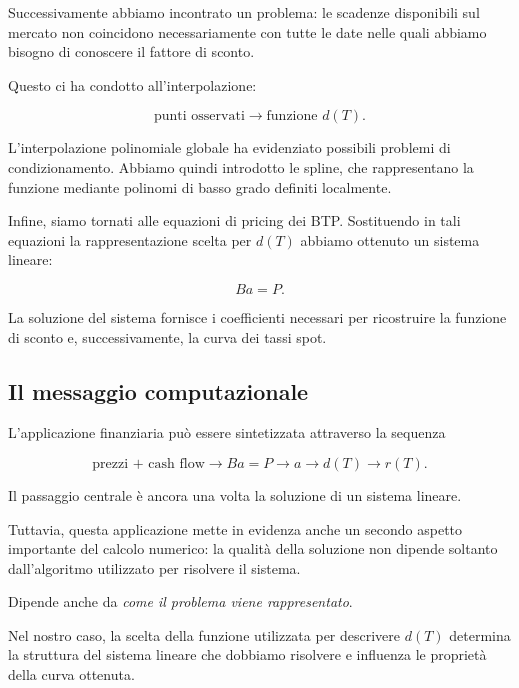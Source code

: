 Successivamente abbiamo incontrato un problema: le scadenze
disponibili sul mercato non coincidono necessariamente con tutte le
date nelle quali abbiamo bisogno di conoscere il fattore di sconto.

Questo ci ha condotto all'interpolazione:

\begin{equation*}
\text{punti osservati}
\longrightarrow
\text{funzione }d(T).
\end{equation*}

L'interpolazione polinomiale globale ha evidenziato possibili
problemi di condizionamento. Abbiamo quindi introdotto le spline,
che rappresentano la funzione mediante polinomi di basso grado
definiti localmente.

Infine, siamo tornati alle equazioni di pricing dei BTP. Sostituendo
in tali equazioni la rappresentazione scelta per $d(T)$ abbiamo
ottenuto un sistema lineare:

\begin{equation*}
    Ba=P.
\end{equation*}

La soluzione del sistema fornisce i coefficienti necessari per
ricostruire la funzione di sconto e, successivamente, la curva dei
tassi spot.


\subsection{Il messaggio computazionale}

L'applicazione finanziaria può essere sintetizzata attraverso la
sequenza

\begin{equation*}
\text{prezzi + cash flow}
\longrightarrow
Ba=P
\longrightarrow
a
\longrightarrow
d(T)
\longrightarrow
r(T).
\end{equation*}

Il passaggio centrale è ancora una volta la soluzione di un sistema
lineare.

Tuttavia, questa applicazione mette in evidenza anche un secondo
aspetto importante del calcolo numerico: la qualità della soluzione
non dipende soltanto dall'algoritmo utilizzato per risolvere il
sistema.

Dipende anche da \emph{come il problema viene rappresentato}.

Nel nostro caso, la scelta della funzione utilizzata per descrivere
$d(T)$ determina la struttura del sistema lineare che dobbiamo
risolvere e influenza le proprietà della curva ottenuta.

